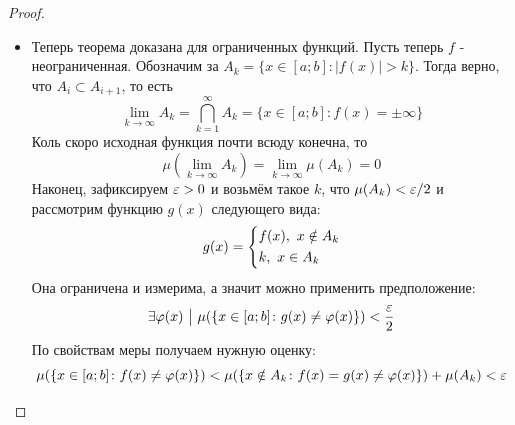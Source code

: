 \begin{proof}
\begin{itemize}
\begin{itemize}
			\item Если $x_0 \in [a; \alpha) \cup (\beta; b]$, то тоже есть непрерывность. При этом отметим, что константы в определении $\phi(x)$ должны быть подогнаны под левую непрерывность в $\alpha$ и правую непрерывность в $\beta$.
			
			\item Если $x_0 \in K_\eps$, то непрерывность тоже есть. Действительно, $h_n \rra f$ и с какого-то номера каждая $h_n$ будет непрерывна в $x_0$ как постоянная функция.
			
			\item Если $x_0 \in [\alpha; \beta] \bs K_\eps$ и при этом $\forall k \in \N\ x_0 \notin (c_k; d_k]$, то рассмотрим произвольную возрастающую последовательность $\{x_k\}_{k = 1}^\infty \subset [a; b] \bs K_\eps$ (не умаляя общности, можем потребовать это, ибо есть открытость множества). Для оценки образов элементов последовательности, разобьём её на конечные группы по вхождению в интервалы $(c_i; d_i)$. Более формально:
			\begin{align*}
				&{x_1, \ldots, x_{t_1} \in (c_{i_1}; d_{i_1})}
				\\
				&{\vdots}
				\\
				&{x_{t_l + 1}, \ldots, x_{t_{l + 1}} \in (c_{i_l}; d_{i_l})}
			\end{align*}
			По определению $\phi(x)$, значения всех элементов в каждой пачке зажаты между значениями $\phi(c_{i_l}) = f(c_{i_l})$, $\phi(d_{i_l}) = f(d_{i_l})$. Так как границы интервалов тоже стремятся к $x_0$ при $l \to \infty$, то и значения буду стремиться к $\phi(x_0)$ соответственно.
		\end{itemize}
		
		\item Теперь теорема доказана для ограниченных функций. Пусть теперь $f$ - неограниченная. Обозначим за $A_k = \{x \in [a; b] \colon |f(x)| > k\}$. Тогда верно, что $A_i \subset A_{i + 1}$, то есть
		\[
			\lim_{k \to \infty} A_k = \bigcap_{k = 1}^\infty A_k = \{x \in [a; b] \colon f(x) = \pm\infty\}
		\]
		Коль скоро исходная функция почти всюду конечна, то
		\[
			\mu(\lim_{k \to \infty} A_k) = \lim_{k \to \infty} \mu(A_k) = 0
		\]
		Наконец, зафиксируем $\varepsilon > 0$ и возьмём такое $k$, что $\mu(A_k) < \varepsilon / 2$ и рассмотрим функцию $g(x)$ следующего вида:
		\[
			g(x) = \left\{\begin{aligned}
				&{f(x),\ x \notin A_k}
				\\
				&{k,\ x \in A_k}
			\end{aligned}\right.
		\]
		Она ограничена и измерима, а значит можно применить предположение:
		\[
			\exists \varphi(x) \ \big|\  \mu(\{x \in [a; b] \colon g(x) \neq \varphi(x)\}) < \frac{\varepsilon}{2}
		\]
		По свойствам меры получаем нужную оценку:
		\[
			\mu(\{x \in [a; b] \colon f(x) \neq \varphi(x)\}) < \mu(\{x \notin A_k \colon f(x) = g(x) \neq \varphi(x)\}) + \mu(A_k) < \varepsilon
		\]
	\end{itemize}
\end{proof}